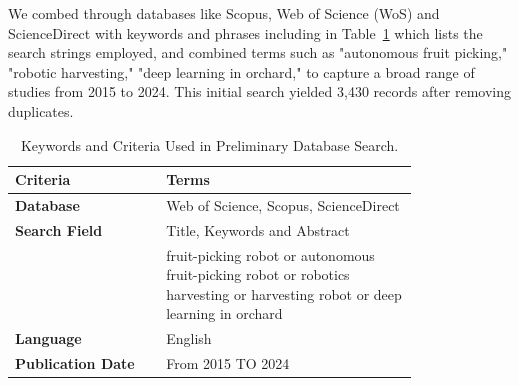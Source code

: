 \documentclass[a4paper,fleqn]{cas-dc}
\begin{document}
We combed through databases like Scopus, Web of Science (WoS) and ScienceDirect with keywords and phrases including in Table~\ref{tab:keywords} which lists the search strings employed, and combined terms such as "autonomous fruit picking," "robotic harvesting," "deep learning in orchard," to capture a broad range of studies from 2015 to 2024. This initial search yielded 3,430 records after removing duplicates.


\begin{table}[ht]
\scriptsize
\caption{Keywords and Criteria Used in Preliminary Database Search.} 
\label{tab:keywords} 
\begin{tabular}{p{0.3\linewidth} p{0.5\linewidth}}
\hline
\textbf{Criteria} & \textbf{Terms} \\ \hline
\textbf{Database}  &  Web of Science, Scopus, ScienceDirect \\
\textbf{Search Field} & Title, Keywords and Abstract\\
 & fruit-picking robot or autonomous fruit-picking robot  or robotics harvesting or harvesting robot or deep learning in orchard\\
\textbf{Language} & English \\
\textbf{Publication Date} & From 2015 TO 2024 \\ \hline 
\end{tabular}
\end{table}
\end{document}
